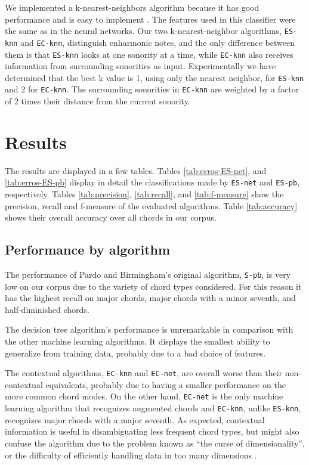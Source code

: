 \documentclass{article}
\begin{document}
We implemented a k-nearest-neighbors algorithm because it has good
performance and is easy to implement \cite{fix.ea89:important,
  gomez.ea04:estimating}. The features used in this classifier were the
same as in the neural networks. Our two k-nearest-neighbor algorithms,
\texttt{ES-knn} and \texttt{EC-knn}, distinguish enharmonic notes, and
the only difference between them is that \texttt{ES-knn} looks at one
sonority at a time, while \texttt{EC-knn} also receives information
from surrounding sonorities as input. Experimentally we have
determined that the best k value is 1, using only the nearest
neighbor, for \texttt{ES-knn} and 2 for \texttt{EC-knn}. The
surrounding sonorities in \texttt{EC-knn} are weighted by a factor of
2 times their distance from the current sonority.

\section{Results}
\label{sec:discussion}

The results are displayed in a few tables. Tables
\ref{tab:erros-ES-net}, and \ref{tab:erros-ES-pb} display in detail
the classifications made by \texttt{ES-net} and \texttt{ES-pb},
respectively. Tables \ref{tab:precision}, \ref{tab:recall}, and
\ref{tab:f-measure} show the precision, recall and f-measure of the
evaluated algorithms. Table \ref{tab:accuracy} shows their overall
accuracy over all chords in our corpus.

\subsection{Performance by algorithm}
\label{sec:algo-perf}

The performance of Pardo and Birmingham's original algorithm,
\texttt{S-pb}, is very low on our corpus due to the variety of chord
types considered. For this reason it has the highest recall on major
chords, major chords with a minor seventh, and half-diminished chords.

The decision tree algorithm's performance is unremarkable in
comparison with the other machine learning algorithms. It displays the
smallest ability to generalize from training data, probably due to a
bad choice of features.

The contextual algorithms, \texttt{EC-knn} and \texttt{EC-net}, are
overall worse than their non-contextual equivalents, probably due to
having a smaller performance on the more common chord modes. On the
other hand, \texttt{EC-net} is the only machine learning algorithm
that recognizes augmented chords and \texttt{EC-knn}, unlike
\texttt{ES-knn}, recognizes major chords with a major seventh. As
expected, contextual information is useful in disambiguating less
frequent chord types, but might also confuse the algorithm due to the
problem known as ``the curse of dimensionality'', or the difficulty of
efficiently handling data in too many dimensions
\cite{duda.ea00:pattern}.
\end{document}
